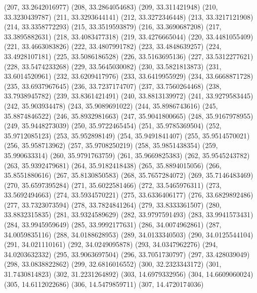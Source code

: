 {					(207, 33.2642016977)
					(208, 33.2864054683)
					(209, 33.311421948)
					(210, 33.3230439787)
					(211, 33.3293644141)
					(212, 33.3272346448)
					(213, 33.3217121908)
					(214, 33.3358772293)
					(215, 33.3519593879)
					(216, 33.3690687208)
					(217, 33.3895882631)
					(218, 33.4083477318)
					(219, 33.4276665044)
					(220, 33.4481055409)
					(221, 33.4663083826)
					(222, 33.4807991782)
					(223, 33.4848639257)
					(224, 33.4928107181)
					(225, 33.5086186528)
					(226, 33.5163695136)
					(227, 33.5312277621)
					(228, 33.5474233268)
					(229, 33.5645030082)
					(230, 33.5821813873)
					(231, 33.6014520961)
					(232, 33.6209417976)
					(233, 33.6419955929)
					(234, 33.6668871728)
					(235, 33.6937967645)
					(236, 33.7237174707)
					(237, 33.7560264468)
					(238, 33.7938945782)
					(239, 33.8361421491)
					(240, 33.8813139972)
					(241, 33.9279583445)
					(242, 35.903934478)
					(243, 35.9089691022)
					(244, 35.8986743616)
					(245, 35.8874846522)
					(246, 35.8932981663)
					(247, 35.9041800665)
					(248, 35.9167978955)
					(249, 35.9448273039)
					(250, 35.9722465454)
					(251, 35.9785369504)
					(252, 35.9712085123)
					(253, 35.952898149)
					(254, 35.9491841407)
					(255, 35.9514570021)
					(256, 35.958713962)
					(257, 35.9708250219)
					(258, 35.9851438354)
					(259, 35.990633314)
					(260, 35.9791763759)
					(261, 35.9669825383)
					(262, 35.9545243782)
					(263, 35.9392479681)
					(264, 35.9182418438)
					(265, 35.8894015056)
					(266, 35.8551880616)
					(267, 35.8130850583)
					(268, 35.7657284072)
					(269, 35.7146483469)
					(270, 35.6597395284)
					(271, 35.6022581466)
					(272, 33.5465976311)
					(273, 33.5692494663)
					(274, 33.5934570221)
					(275, 33.6336406177)
					(276, 33.6829892486)
					(277, 33.7323073594)
					(278, 33.7824841264)
					(279, 33.8333361507)
					(280, 33.8832315835)
					(281, 33.9324589629)
					(282, 33.9797591493)
					(283, 33.9941573431)
					(284, 33.9945959649)
					(285, 33.9992177631)
					(286, 34.0074962861)
					(287, 34.0059835116)
					(288, 34.0188628953)
					(289, 34.0133340503)
					(290, 34.0125544104)
					(291, 34.021110161)
					(292, 34.0249095878)
					(293, 34.0347962276)
					(294, 34.0203632332)
					(295, 33.9063697504)
					(296, 33.7051730797)
					(297, 33.428039049)
					(298, 33.0838822862)
					(299, 32.6816016552)
					(300, 32.2323343172)
					(301, 31.7430814823)
					(302, 31.2231264892)
					(303, 14.6979332956)
					(304, 14.6609060024)
					(305, 14.6112022686)
					(306, 14.5479859711)
					(307, 14.4720174036)
}
